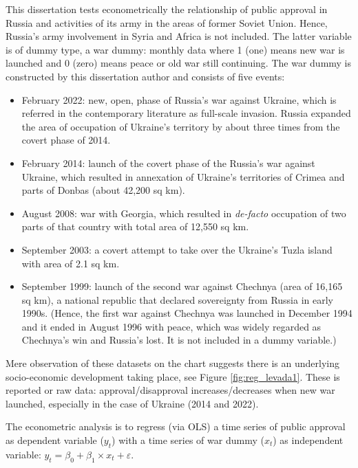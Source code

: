 This dissertation tests econometrically the relationship of public approval in Russia and activities of its army in the areas of former Soviet Union. Hence, Russia's army involvement in Syria and Africa is not included. The latter variable is of dummy type, a war dummy: monthly data where 1 (one) means new war is launched and 0 (zero) means peace or old war still continuing. The war dummy is constructed by this dissertation author and consists of five events:

\begin{itemize}
    \item February 2022: new, open, phase of Russia's war against Ukraine, which is referred in the contemporary literature as full-scale invasion. Russia expanded the area of occupation of Ukraine's territory by about three times from the covert phase of 2014.  
    \item February 2014: launch of the covert phase of the Russia's war against Ukraine, which resulted in annexation of Ukraine's territories of Crimea and parts of Donbas (about 42,200 sq km).
    \item August 2008: war with Georgia, which resulted in \textit{de-facto} occupation of two parts of that country with total area of 12,550 sq km.
    \item September 2003: a covert attempt to take over the Ukraine's Tuzla island with area of 2.1 sq km. 
    \item September 1999: launch of the second war against Chechnya (area of 16,165 sq km), a national republic that declared sovereignty from Russia in early 1990s. (Hence, the first war against Chechnya was launched in December 1994 and it ended in August 1996 with peace, which was widely regarded as Chechnya's win and Russia's lost. It is not included in a dummy variable.)
\end{itemize}

Mere observation of these datasets on the chart suggests there is an underlying socio-economic development taking place, see Figure \ref{fig:reg_levada1}. These is reported or raw data: approval/disapproval increases/decreases when new war launched, especially in the case of Ukraine (2014 and 2022).

The econometric analysis is to regress (via OLS) a time series of public approval as dependent variable ($y_t$) with a time series of war dummy ($x_t$) as independent variable: $y_t=\beta_0+\beta_1 \times x_t + \varepsilon$.

